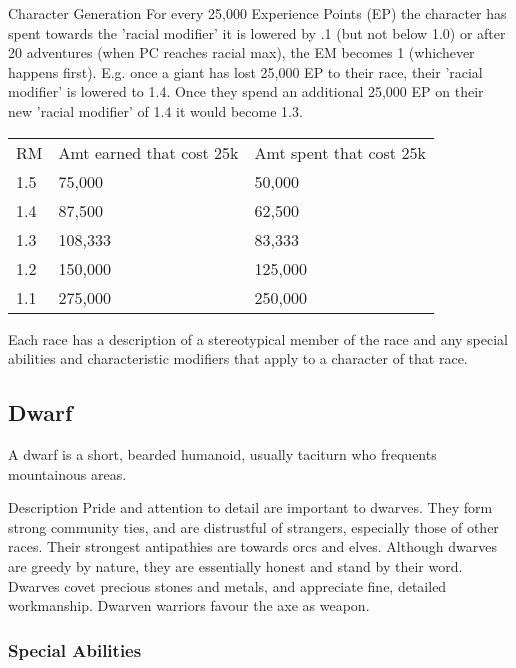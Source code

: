 \begin{Chapter}{Character Generation}
For every 25,000 Experience Points (EP) the character has spent
towards the 'racial modifier' it is lowered by .1 (but not below 1.0)
or after 20 adventures (when PC reaches racial max), the EM becomes 1
(whichever happens first).  E.g.  once a giant has lost 25,000 EP to
their race, their 'racial modifier' is lowered to 1.4.  Once they
spend an additional 25,000 EP on their new 'racial modifier' of 1.4 it
would become 1.3.

\begin{tabularx}{\columnwidth}{lXX}
RM	& Amt earned that cost 25k	& Amt spent that cost 25k  \\
1.5	& 75,000			& 50,000 \\
1.4	& 87,500			& 62,500 \\
1.3	& 108,333			& 83,333 \\
1.2	& 150,000			& 125,000 \\
1.1	& 275,000			& 250,000 \\
\end{tabularx}

Each race has a description of a stereotypical member of the race and
any special abilities and characteristic modifiers that apply to a
character of that race.

\subsection{Dwarf}

A dwarf is a short, bearded humanoid, usually taciturn who frequents
mountainous areas.

\begin{Description}
\item[Description] Pride and attention to detail are important to
  dwarves.  They form strong community ties, and are distrustful of
  strangers, especially those of other races. Their strongest
  antipathies are towards orcs and elves.  Although dwarves are greedy
  by nature, they are essentially honest and stand by their
  word. Dwarves covet precious stones and metals, and appreciate fine,
  detailed workmanship.  Dwarven warriors favour the axe as weapon.
\end{Description}

\subsubsection{Special Abilities}

\begin{Enumerate}


\end{Enumerate}
\end{Chapter}
